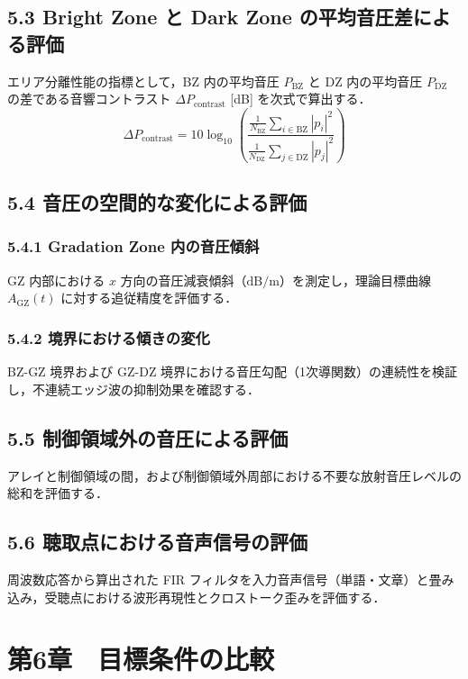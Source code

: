 \documentclass[11pt, a4paper]{article}
\begin{document}
\subsection{5.3 Bright Zone と Dark Zone の平均音圧差による評価}
エリア分離性能の指標として，BZ 内の平均音圧 $P_{\mathrm{BZ}}$ と DZ 内の平均音圧 $P_{\mathrm{DZ}}$ の差である音響コントラスト $\Delta P_{\mathrm{contrast}}$ [dB] を次式で算出する．
\begin{equation}
\Delta P_{\mathrm{contrast}} = 10 \log_{10} \left( \frac{\frac{1}{N_{\mathrm{BZ}}} \sum_{i \in \mathrm{BZ}} |p_i|^2}{\frac{1}{N_{\mathrm{DZ}}} \sum_{j \in \mathrm{DZ}} |p_j|^2} \right)
\end{equation}

\subsection{5.4 音圧の空間的な変化による評価}
\subsubsection{5.4.1 Gradation Zone 内の音圧傾斜}
GZ 内部における $x$ 方向の音圧減衰傾斜（$\mathrm{dB/m}$）を測定し，理論目標曲線 $A_{\mathrm{GZ}}(t)$ に対する追従精度を評価する．

\subsubsection{5.4.2 境界における傾きの変化}
BZ-GZ 境界および GZ-DZ 境界における音圧勾配（1次導関数）の連続性を検証し，不連続エッジ波の抑制効果を確認する．

\subsection{5.5 制御領域外の音圧による評価}
アレイと制御領域の間，および制御領域外周部における不要な放射音圧レベルの総和を評価する．

\subsection{5.6 聴取点における音声信号の評価}
周波数応答から算出された FIR フィルタを入力音声信号（単語・文章）と畳み込み，受聴点における波形再現性とクロストーク歪みを評価する．

\section{第6章　目標条件の比較}
\end{document}
